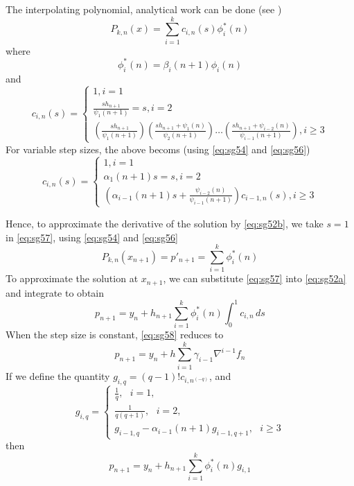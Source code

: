 The interpolating polynomial, analytical work can be done (see \cite{Shampine1975}) 
\begin{equation}\label{eq:sg57}
  P_{k,n} (x) = \sum_{i=1}^{k} c_{i,n} (s) \phi ^{*}_{i} (n)
\end{equation}
where
\begin{equation}
  \phi ^{*}_{i} (n) = \beta _i (n+1) \phi _i (n)
\end{equation}
and
\begin{equation}\label{eq:sg56}
  c_{i,n}(s) = \begin{cases}
    1, i=1 \\
    \frac{s h_{n+1}}{\psi _1 (n+1)} = s, i=2 \\
    \left(\frac{sh_{n+1}}{\psi _1(n+1)}\right)
    \left(\frac{sh_{n+1} + \psi _1(n)}{\psi _2(n+1)}\right)
    \dots
    \left(\frac{sh_{n+1} + \psi _{i-2}(n)}{\psi _{i-1}(n+1)}\right), i \ge 3
  \end{cases}
\end{equation}
For variable step sizes, the above becoms (using \autoref{eq:sg54} and \autoref{eq:sg56})
\begin{equation}\label{}
  c_{i,n}(s) = \begin{cases}
    1, i=1 \\
    \alpha _1 (n+1) s = s, i=2 \\
    \left( \alpha _{i-1} (n+1) s + \frac{\psi _{i-2}(n)}{\psi _{i-1}(n+1)} \right) c_{i-1,n}(s) , i \ge 3
  \end{cases}
\end{equation}

Hence, to approximate the derivative of the solution by \autoref{eq:sg52b}, we 
take $s=1$ in \autoref{eq:sg57}, using \autoref{eq:sg54} and \autoref{eq:sg56}
\begin{equation}
  P_{k,n} (x_{n+1}) = p'_{n+1} = \sum^{k}_{i=1} \phi^{*}_{i} (n)
\end{equation}
To approximate the solution at $x_{n+1}$, we can substitute \autoref{eq:sg57} 
into \autoref{eq:sg52a} and integrate to obtain
\begin{equation}\label{eq:sg58}
  p_{n+1} = y_n + h_{n+1} \sum_{i=1}^{k} \phi ^{*}_{i} (n) \int_{0}^{1} c_{i,n} \,ds
\end{equation}
When the step size is constant, \autoref{eq:sg58} reduces to
\begin{equation}
  p_{n+1} = y_n +h \sum_{i=1}^{k} \gamma _{i-1} \nabla ^{i-1} f_n
\end{equation}
If we define the quantity $g_{i,q}=(q-1)!c_{i,n^{(-q)}}$, and 
\begin{equation}\label{eq:sg510}
  g_{i,q} = \begin{cases}
    \frac{1}{q}, \text{ } i=1,\\
    \frac{1}{q(q+1)}, \text{ } i=2,\\
    g_{i-1,q} - \alpha_{i-1}(n+1)g_{i-1,q+1}, \text{ } i \ge 3
  \end{cases}
\end{equation}
then
\begin{equation}\label{eq:sg511}
  p_{n+1} = y_n + h_{n+1} 
    \sum_{i=1}^{k} \phi ^{*}_{i} (n) g_{i,1}
\end{equation}


